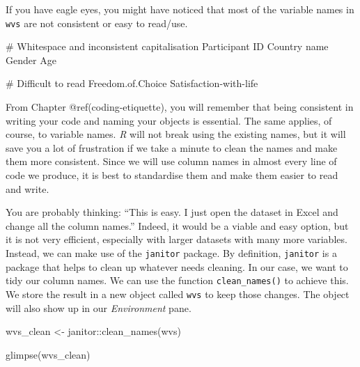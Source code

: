 \documentclass[
  letterpaper,
]{krantz}
\makeatletter
\newenvironment{Shaded}{\begin{snugshade}}{\end{snugshade}}
\newcommand{\CommentTok}[1]{\textcolor[rgb]{0.37,0.37,0.37}{#1}}
\newcommand{\FunctionTok}[1]{\textcolor[rgb]{0.28,0.35,0.67}{#1}}
\newcommand{\NormalTok}[1]{\textcolor[rgb]{0.00,0.23,0.31}{#1}}
\newcommand{\OtherTok}[1]{\textcolor[rgb]{0.00,0.23,0.31}{#1}}
\newcommand{\SpecialCharTok}[1]{\textcolor[rgb]{0.37,0.37,0.37}{#1}}
\newenvironment{kframe}{%
\medskip{}
\setlength{\fboxsep}{.8em}
 \def\at@end@of@kframe{}%
 \ifinner\ifhmode%
  \def\at@end@of@kframe{\end{minipage}}%
  \begin{minipage}{\columnwidth}%
 \fi\fi%
 \def\FrameCommand##1{\hskip\@totalleftmargin \hskip-\fboxsep
 \colorbox{shadecolor}{##1}\hskip-\fboxsep
     \hskip-\linewidth \hskip-\@totalleftmargin \hskip\columnwidth}%
 \MakeFramed {\advance\hsize-\width
   \@totalleftmargin\z@ \linewidth\hsize
   \@setminipage}}%
 {\par\unskip\endMakeFramed%
 \at@end@of@kframe}
\renewenvironment{Shaded}{\begin{kframe}}{\end{kframe}}
\makeatother
\begin{document}
If you have eagle eyes, you might have noticed that most of the variable
names in \texttt{wvs} are not consistent or easy to read/use.

\label{messy_column_names}%
\begin{Shaded}
\begin{Highlighting}[]
\CommentTok{\# Whitespace and inconsistent capitalisation}
\NormalTok{Participant ID        }
\NormalTok{Country name          }
\NormalTok{Gender                }
\NormalTok{Age                   }

\CommentTok{\# Difficult to read}
\NormalTok{Freedom.of.Choice     }
\NormalTok{Satisfaction}\SpecialCharTok{{-}}\NormalTok{with}\SpecialCharTok{{-}}\NormalTok{life}
\end{Highlighting}
\end{Shaded}

From Chapter @ref(coding-etiquette), you will remember that being
consistent in writing your code and naming your objects is essential.
The same applies, of course, to variable names. \emph{R} will not break
using the existing names, but it will save you a lot of frustration if
we take a minute to clean the names and make them more consistent. Since
we will use column names in almost every line of code we produce, it is
best to standardise them and make them easier to read and write.

You are probably thinking: ``This is easy. I just open the dataset in
Excel and change all the column names.'' Indeed, it would be a viable
and easy option, but it is not very efficient, especially with larger
datasets with many more variables. Instead, we can make use of the
\texttt{janitor} package. By definition, \texttt{janitor} is a package
that helps to clean up whatever needs cleaning. In our case, we want to
tidy our column names. We can use the function \texttt{clean\_names()}
to achieve this. We store the result in a new object called \texttt{wvs}
to keep those changes. The object will also show up in our
\emph{Environment} pane.

\begin{Shaded}
\begin{Highlighting}[]
\NormalTok{wvs\_clean }\OtherTok{\textless{}{-}}\NormalTok{ janitor}\SpecialCharTok{::}\FunctionTok{clean\_names}\NormalTok{(wvs)}

\FunctionTok{glimpse}\NormalTok{(wvs\_clean)}
\end{Highlighting}
\end{Shaded}
\end{document}
